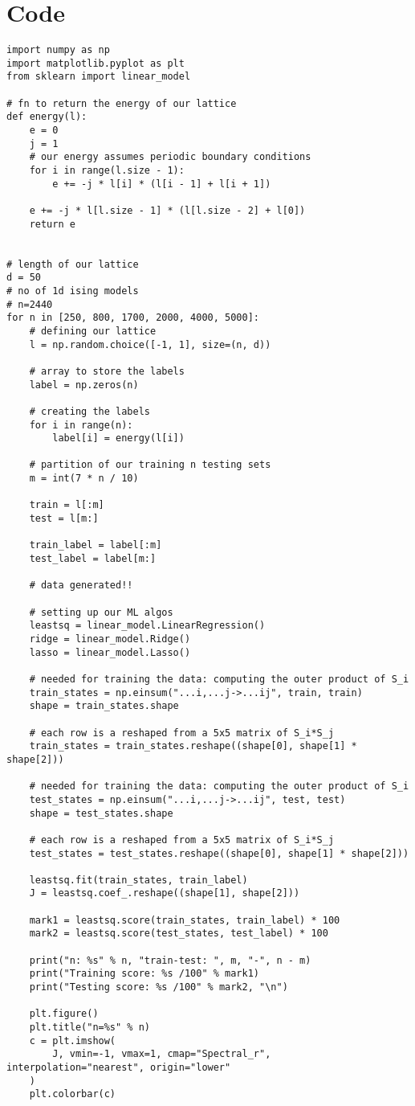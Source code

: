 \appendix
\section{Code}

\onecolumn
\begin{verbatim}
import numpy as np
import matplotlib.pyplot as plt
from sklearn import linear_model

# fn to return the energy of our lattice
def energy(l):
    e = 0
    j = 1
    # our energy assumes periodic boundary conditions
    for i in range(l.size - 1):
        e += -j * l[i] * (l[i - 1] + l[i + 1])

    e += -j * l[l.size - 1] * (l[l.size - 2] + l[0])
    return e


# length of our lattice
d = 50
# no of 1d ising models
# n=2440
for n in [250, 800, 1700, 2000, 4000, 5000]:
    # defining our lattice
    l = np.random.choice([-1, 1], size=(n, d))

    # array to store the labels
    label = np.zeros(n)

    # creating the labels
    for i in range(n):
        label[i] = energy(l[i])

    # partition of our training n testing sets
    m = int(7 * n / 10)

    train = l[:m]
    test = l[m:]

    train_label = label[:m]
    test_label = label[m:]

    # data generated!!

    # setting up our ML algos
    leastsq = linear_model.LinearRegression()
    ridge = linear_model.Ridge()
    lasso = linear_model.Lasso()

    # needed for training the data: computing the outer product of S_i
    train_states = np.einsum("...i,...j->...ij", train, train)
    shape = train_states.shape

    # each row is a reshaped from a 5x5 matrix of S_i*S_j
    train_states = train_states.reshape((shape[0], shape[1] * shape[2]))

    # needed for training the data: computing the outer product of S_i
    test_states = np.einsum("...i,...j->...ij", test, test)
    shape = test_states.shape

    # each row is a reshaped from a 5x5 matrix of S_i*S_j
    test_states = test_states.reshape((shape[0], shape[1] * shape[2]))

    leastsq.fit(train_states, train_label)
    J = leastsq.coef_.reshape((shape[1], shape[2]))

    mark1 = leastsq.score(train_states, train_label) * 100
    mark2 = leastsq.score(test_states, test_label) * 100

    print("n: %s" % n, "train-test: ", m, "-", n - m)
    print("Training score: %s /100" % mark1)
    print("Testing score: %s /100" % mark2, "\n")

    plt.figure()
    plt.title("n=%s" % n)
    c = plt.imshow(
        J, vmin=-1, vmax=1, cmap="Spectral_r", interpolation="nearest", origin="lower"
    )
    plt.colorbar(c)
\end{verbatim}

\twocolumn
